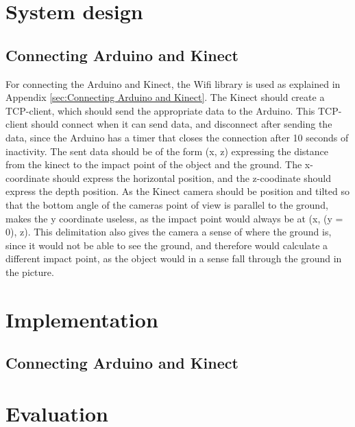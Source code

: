 \section{System design}
\label{sec:i3System design}

\subsection{Connecting Arduino and Kinect}
\label{sec:i3Connecting Arduino and Kinect system design}
For connecting the Arduino and Kinect, the Wifi library is used as explained in Appendix \ref{sec:Connecting Arduino and Kinect}. The Kinect should create a TCP-client, which should send the appropriate data to the Arduino. This TCP-client should connect when it can send data, and disconnect after sending the data, since the Arduino has a timer that closes the connection after 10 seconds of inactivity. The sent data should be of the form (x, z) expressing the distance from the kinect to the impact point of the object and the ground. The x-coordinate should express the horizontal position, and the z-coodinate should express the depth position. As the Kinect camera should be position and tilted so that the bottom angle of the cameras point of view is parallel to the ground, makes the y coordinate useless, as the impact point would always be at (x, (y = 0), z). This delimitation also gives the camera a sense of where the ground is, since it would not be able to see the ground, and therefore would calculate a different impact point, as the object would in a sense fall through the ground in the picture. 

\section{Implementation}
\label{sec:i3Implementation}

\subsection{Connecting Arduino and Kinect}
\label{sec:i3Connecting Arduino and Kinect implementation}

\section{Evaluation}
\label{sec:i3Evaluation}
